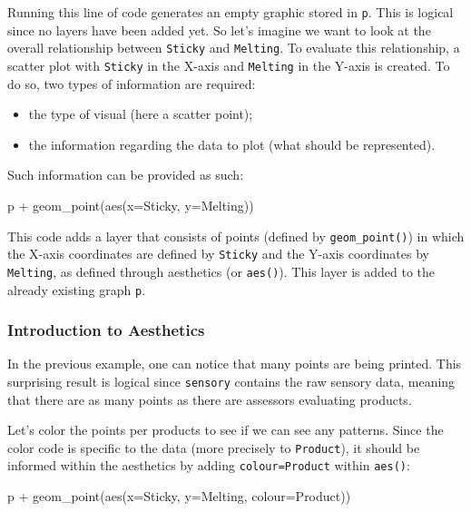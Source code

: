 \documentclass[
]{krantz}
\makeatletter
\newenvironment{Shaded}{\begin{snugshade}}{\end{snugshade}}
\newcommand{\AttributeTok}[1]{\textcolor[rgb]{0.61,0.61,0.61}{#1}}
\newcommand{\FunctionTok}[1]{\textcolor[rgb]{0,0,0}{#1}}
\newcommand{\NormalTok}[1]{#1}
\newcommand{\SpecialCharTok}[1]{\textcolor[rgb]{0,0,0}{#1}}
\providecommand{\tightlist}{%
  \setlength{\itemsep}{0pt}\setlength{\parskip}{0pt}}
\newenvironment{kframe}{%
\medskip{}
\setlength{\fboxsep}{.8em}
 \def\at@end@of@kframe{}%
 \ifinner\ifhmode%
  \def\at@end@of@kframe{\end{minipage}}%
  \begin{minipage}{\columnwidth}%
 \fi\fi%
 \def\FrameCommand##1{\hskip\@totalleftmargin \hskip-\fboxsep
 \colorbox{shadecolor}{##1}\hskip-\fboxsep
     \hskip-\linewidth \hskip-\@totalleftmargin \hskip\columnwidth}%
 \MakeFramed {\advance\hsize-\width
   \@totalleftmargin\z@ \linewidth\hsize
   \@setminipage}}%
 {\par\unskip\endMakeFramed%
 \at@end@of@kframe}
\renewenvironment{Shaded}{\begin{kframe}}{\end{kframe}}
\makeatother
\begin{document}
Running this line of code generates an empty graphic stored in \texttt{p}. This is logical since no layers have been added yet.
So let's imagine we want to look at the overall relationship between \texttt{Sticky} and \texttt{Melting}. To evaluate this relationship, a scatter plot with \texttt{Sticky} in the X-axis and \texttt{Melting} in the Y-axis is created. To do so, two types of information are required:

\begin{itemize}
\tightlist
\item
  the type of visual (here a scatter point);
\item
  the information regarding the data to plot (what should be represented).
\end{itemize}

Such information can be provided as such:

\begin{Shaded}
\begin{Highlighting}[]
\NormalTok{p }\SpecialCharTok{+} \FunctionTok{geom\_point}\NormalTok{(}\FunctionTok{aes}\NormalTok{(}\AttributeTok{x=}\NormalTok{Sticky, }\AttributeTok{y=}\NormalTok{Melting))}
\end{Highlighting}
\end{Shaded}

This code adds a layer that consists of points (defined by \texttt{geom\_point()}) in which the X-axis coordinates are defined by \texttt{Sticky} and the Y-axis coordinates by \texttt{Melting}, as defined through aesthetics (or \texttt{aes()}). This layer is added to the already existing graph \texttt{p}.

\hypertarget{scatter}{%
\subsubsection{Introduction to Aesthetics}\label{scatter}}

In the previous example, one can notice that many points are being printed. This surprising result is logical since \texttt{sensory} contains the raw sensory data, meaning that there are as many points as there are assessors evaluating products.

Let's color the points per products to see if we can see any patterns. Since the color code is specific to the data (more precisely to \texttt{Product}), it should be informed within the aesthetics by adding \texttt{colour=Product} within \texttt{aes()}:

\begin{Shaded}
\begin{Highlighting}[]
\NormalTok{p }\SpecialCharTok{+} \FunctionTok{geom\_point}\NormalTok{(}\FunctionTok{aes}\NormalTok{(}\AttributeTok{x=}\NormalTok{Sticky, }\AttributeTok{y=}\NormalTok{Melting, }\AttributeTok{colour=}\NormalTok{Product))}
\end{Highlighting}
\end{Shaded}
\end{document}
